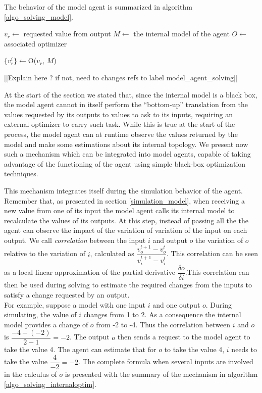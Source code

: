 The behavior of the model agent is summarized in algorithm \ref{algo_solving_model}.

\begin{algorithm}
\caption{Collective Solving - Model Agent Behavior}
\label{algo_solving_model}

	$v_r \leftarrow$ requested value from output\;
	$M \leftarrow$ the internal model of the agent\;
	$O \leftarrow$ associated optimizer\;
	
	$\{v_r^i\} \leftarrow $O($v_r$, $M$) \;
\end{algorithm}

[[Explain here ? if not, need to changes refs to label model_agent_solving]]

At the start of the section we stated that, since the internal model is a black box, the model agent cannot in itself perform the \enquote{bottom-up} translation from the values requested by its outputs to values to ask to its inputs, requiring an external optimizer to carry such task. While this is true at the start of the process, the model agent can at runtime observe the values returned by the model and make some estimations about its internal topology. We present now such a mechanism which can be integrated into model agents, capable of taking advantage of the functioning of the agent using simple black-box optimization techniques.

This mechanism integrates itself during the simulation behavior of the agent. Remember that, as presented in section \ref{simulation_model}, when receiving a new value from one of its input the model agent calls its internal model to recalculate the values of its outputs. At this step, instead of passing all the the agent can observe the impact of the variation of variation of the input on each output. We call \emph{correlation} between the input $i$ and output $o$ the variation of $o$ relative to the variation of $i$, calculated as $\dfrac{v_o^{t+1} - v_o^t}{v_i^{t+1} - v_i^t}$. This correlation can be seen as a local linear approximation of the partial derivative $\dfrac{\delta o}{\delta i}$.This correlation can then be used during solving to estimate the required changes from the inputs to satisfy a change requested by an output.\\
For example, suppose a model with one input $i$ and one output $o$. During simulating, the value of $i$ changes from 1 to 2. As a consequence the internal model provides a change of $o$ from -2 to -4. Thus the correlation between $i$ and $o$ is $\dfrac{-4 - (-2)}{2 - 1} = -2$. The output $o$ then sends a request to the model agent to take the value 4. The agent can estimate that for $o$ to take the value 4, $i$ needs to take the value $\dfrac{4}{-2} = -2$.
The complete formula when several inputs are involved in the calculus of $o$ is presented with the summary of the mechanism in algorithm \ref{algo_solving_internaloptim}.

